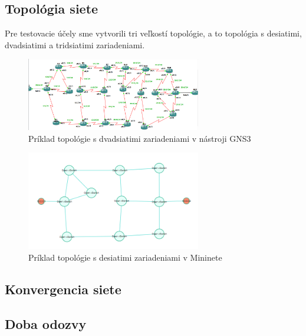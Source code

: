 \documentclass[conference]{IEEEtran}
\begin{document}
\subsection{Topológia siete}

Pre testovacie účely sme vytvorili tri veľkostí topológie, a to topológia s desiatimi, dvadsiatimi a tridsiatimi zariadeniami. 

\begin{figure}[h!]
\centering
\includegraphics[width=3in]{../img/topology}
\caption{Príklad topológie s dvadsiatimi zariadeniami v nástroji GNS3}
\end{figure}

\begin{figure}[h!]
\centering
\includegraphics[width=3in]{../img/topologySDN}
\caption{Príklad topológie s desiatimi zariadeniami v Mininete}
\end{figure}

\subsection{Konvergencia siete}

\subsection{Doba odozvy}


\subsection{}



\section{}
\end{document}
